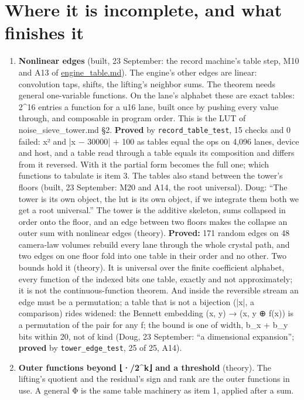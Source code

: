 \section{\texorpdfstring{Where it is incomplete, and what finishes it}{Where it is incomplete, and what finishes it}}

\begin{enumerate}
\item \textbf{Nonlinear edges} (built, 23 September: the record machine's table step, M10 and A13 of \hyperref[chap:engine-table]{engine\_\allowbreak{}table.md}). The engine's other edges are linear: convolution taps, shifts, the lifting's neighbor sums. The theorem needs general one-variable functions. On the lane's alphabet these are exact tables: 2\textasciicircum{}16 entries a function for a u16 lane, built once by pushing every value through, and composable in program order. This is the LUT of noise\_\allowbreak{}sieve\_\allowbreak{}tower.md §2. \textbf{Proved} by \texttt{record\_\allowbreak{}table\_\allowbreak{}test}, 15 checks and 0 failed: x² and |x − 30000| + 100 as tables equal the ops on 4,096 lanes, device and host, and a table read through a table equals its composition and differs from it reversed. With it the partial form becomes the full one; which functions to tabulate is item 3. The tables also stand between the tower's floors (built, 23 September: M20 and A14, the root universal). Doug: “The tower is its own object, the lut is its own object, if we integrate them both we get a root universal.” The tower is the additive skeleton, sums collapsed in order onto the floor, and an edge between two floors makes the collapse an outer sum with nonlinear edges (theory). \textbf{Proved:} 171 random edges on 48 camera-law volumes rebuild every lane through the whole crystal path, and two edges on one floor fold into one table in their order and no other. Two bounds hold it (theory). It is universal over the finite coefficient alphabet, every function of the indexed bits one table, exactly and not approximately; it is not the continuous-function theorem. And inside the reversible stream an edge must be a permutation; a table that is not a bijection (|x|, a comparison) rides widened: the Bennett embedding (x, y) → (x, y ⊕ f(x)) is a permutation of the pair for any f; the bound is one of width, b\_\allowbreak{}x + b\_\allowbreak{}y bits within 20, not of kind (Doug, 23 September: “a dimensional expansion”; \textbf{proved} by \texttt{tower\_\allowbreak{}edge\_\allowbreak{}test}, 25 of 25, A14).
\item \textbf{Outer functions beyond ⌊·/2\textasciicircum{}k⌋ and a threshold} (theory). The lifting's quotient and the residual's sign and rank are the outer functions in use. A general Φ is the same table machinery as item 1, applied after a sum.

\end{enumerate}
